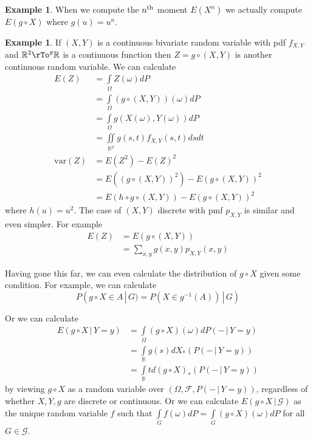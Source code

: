 \documentclass[12pt]{amsart}
\theoremstyle{definition}
\newtheorem{example}[theorem]{Example}
\begin{document}
\begin{example} When we compute the $n^{\textnormal{th}}$ moment $E(X^n)$ we actually compute $E(g \circ X)$ where $g(u) = u^n$.
\end{example}

\begin{example} If $(X, Y)$ is a continuous bivariate random variable with pdf $f_{X, Y}$ and $\mathbb{R}^2 \rTo^g \mathbb{R}$ is a continuous function then $Z =g \circ (X, Y)$ is another continuous random variable. We can calculate
\begin{align*}
E(Z) & = \int\limits_{\Omega} Z(\omega) dP \\
 & = \int\limits_{\Omega} (g \circ (X, Y))(\omega) dP \\
 & = \int\limits_{\Omega} g(X(\omega), Y(\omega)) dP \\
 & = \iint \limits_{\mathbb{R}^2} g(s, t)f_{X, Y}(s, t) ds dt \\
\text{var}(Z) & = E(Z^2) - E(Z)^2 \\
 & = E((g \circ (X, Y))^2) - E(g \circ (X, Y))^2 \\
 & = E(h \circ g \circ (X, Y)) - E(g \circ (X, Y))^2
\end{align*}
where $h(u) = u^2$. The case of $(X, Y)$ discrete with pmf $p_{X, Y}$ is similar and even simpler. For example
\begin{align*}
E(Z) & = E(g \circ (X, Y)) \\
 & = \sum\limits_{x, y}g(x, y)p_{X, Y}(x, y)
\end{align*}
\end{example}

Having gone this far, we can even calculate the distribution of $g \circ X$ given some condition. For example, we can calculate
$$P(g \circ X \in A \,|\, G) = P(X \in g^{-1}(A)) \,|\, G)$$

Or we can calculate
\begin{align*}
E(g \circ X \,|\, Y = y) & = \int\limits_{\Omega} (g \circ X)(\omega) dP( - \,|\, Y = y) \\
 & = \int\limits_{\mathbb{R}} g(s) dX_*(P( - \,|\, Y = y)) \\
 & = \int\limits_{\mathbb{R}} t d(g \circ X)_*(P( - \,|\, Y = y))
\end{align*}
by viewing $g \circ X$ as a random variable over $(\Omega, \mathcal{F}, P( - \,|\, Y = y))$, regardless of whether $X, Y, g$ are discrete or continuous. Or we can calculate $E(g \circ X \,|\, \mathcal{G})$ as the unique random variable $f$ such that $\int\limits_G f(\omega)dP = \int\limits_G (g \circ X)(\omega)dP$ for all $G \in \mathcal{G}$.
\end{document}

